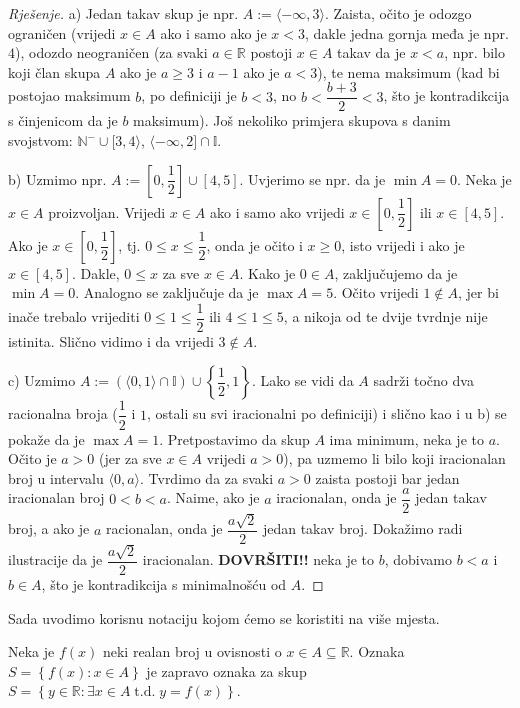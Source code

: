 \begin{proof}[Rješenje]
a) Jedan takav skup je npr. $A:=\langle -\infty, 3\rangle$. Zaista, očito je odozgo ograničen (vrijedi $x\in A$ ako i samo ako je $x<3$, dakle jedna gornja međa je npr. $4$), odozdo neograničen (za svaki $a\in \mathbb{R}$ postoji $x\in A$ takav da je $x<a$, npr. bilo koji član skupa $A$ ako je $a\geq 3$ i $a-1$ ako je $a<3$), te nema maksimum (kad bi postojao maksimum $b$, po definiciji je $b<3$, no $b<\dfrac{b+3}{2}<3$, što je kontradikcija s činjenicom da je $b$ maksimum). Još nekoliko primjera skupova s danim svojstvom: $\mathbb{N}^-\cup [3, 4\rangle$, $\langle -\infty, 2]\cap \mathbb{I}$.

b) Uzmimo npr. $A:=\left[0,\dfrac{1}{2}\right]\cup \left[4, 5\right]$. Uvjerimo se npr. da je $\min{A}=0$. Neka je $x\in A$ proizvoljan. Vrijedi $x\in A$ ako i samo ako vrijedi $x\in \left[0,\dfrac{1}{2}\right]$ ili $x\in [4, 5]$. Ako je $x\in \left[0,\dfrac{1}{2}\right]$, tj. $0\leq x\leq \dfrac{1}{2}$, onda je očito i $x\geq 0$, isto vrijedi i ako je $x\in [4, 5]$. Dakle, $0\leq x$ za sve $x\in A$. Kako je $0\in A$, zaključujemo da je $\min{A}=0$. Analogno se zaključuje da je $\max{A}=5$. Očito vrijedi $1\notin A$, jer bi inače trebalo vrijediti $0\leq 1\leq \dfrac{1}{2}$ ili $4\leq 1\leq 5$, a nikoja od te dvije tvrdnje nije istinita. Slično vidimo i da vrijedi $3\notin A$.

c) Uzmimo $A:=\left(\langle 0, 1\rangle\cap \mathbb{I}\right)\cup \left\{\dfrac{1}{2}, 1\right\}$. Lako se vidi da $A$ sadrži točno dva racionalna broja ($\dfrac{1}{2}$ i $1$, ostali su svi iracionalni po definiciji) i slično kao i u b) se pokaže da je $\max{A}=1$. Pretpostavimo da skup $A$ ima minimum, neka je to $a$. Očito je $a>0$ (jer za sve $x\in A$ vrijedi $a>0$), pa uzmemo li bilo koji iracionalan broj u intervalu $\langle 0, a\rangle$. Tvrdimo da za svaki $a>0$ zaista postoji bar jedan iracionalan broj $0<b<a$. Naime, ako je $a$ iracionalan, onda je $\dfrac{a}{2}$ jedan takav broj, a ako je $a$ racionalan, onda je $\dfrac{a\sqrt{2}}{2}$ jedan takav broj. Dokažimo radi ilustracije da je $\dfrac{a\sqrt{2}}{2}$ iracionalan. \textbf{DOVRŠITI!!} neka je to $b$, dobivamo $b<a$ i $b\in A$, što je kontradikcija s minimalnošću od $A$.
\end{proof}
Sada uvodimo korisnu notaciju kojom ćemo se koristiti na više mjesta.

\begin{definition}
Neka je $f(x)$ neki realan broj u ovisnosti o $x\in A\subseteq \mathbb{R}$. Oznaka $S=\left\{f(x) : x\in A\right\}$ je zapravo oznaka za skup $S=\left\{y\in \mathbb{R} : \exists x\in A \;\mathrm{t.d.}\; y=f(x)\right\}$.
\end{definition}

